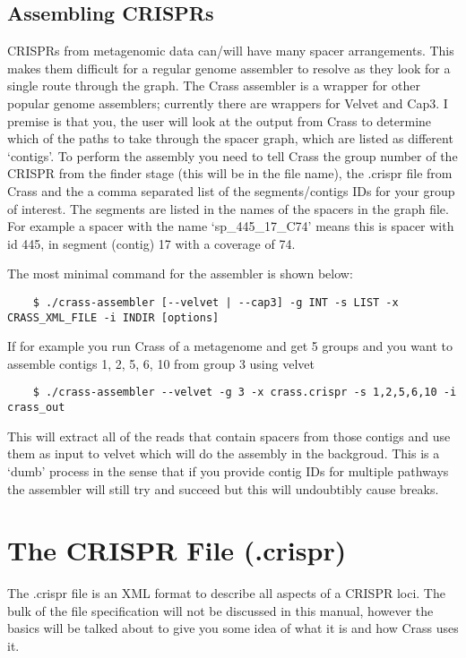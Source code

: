 \documentclass[11pt]{article} %
\begin{document}
\subsection{Assembling CRISPRs}
CRISPRs from metagenomic data can/will have many spacer arrangements.  
This makes them difficult for a regular genome assembler to resolve as they look for a single route through the graph.   
The Crass assembler is a wrapper for other popular genome assemblers; currently there are wrappers for Velvet and Cap3.  
I premise is that you, the user will look at the output from Crass to determine which of the paths to take through the spacer graph, which are listed as different `contigs'. 
To perform the assembly you need to tell Crass the group number of the CRISPR from the finder stage (this will be in the file name), the .crispr file from Crass and the a comma separated list of the segments/contigs IDs for your group of interest.  
The segments are listed in the names of the spacers in the graph file.  
For example a spacer with the name `sp\_445\_17\_C74' means this is spacer with id 445, in segment (contig) 17 with a coverage of 74.

  The most minimal command for the assembler is shown below: 
 \begin{lstlisting}
    $ ./crass-assembler [--velvet | --cap3] -g INT -s LIST -x CRASS_XML_FILE -i INDIR [options]
\end{lstlisting}
 If for example you run Crass of a metagenome and get 5 groups and you want to assemble contigs 1, 2, 5, 6, 10 from group 3 using velvet
 \begin{lstlisting}
	$ ./crass-assembler --velvet -g 3 -x crass.crispr -s 1,2,5,6,10 -i crass_out
\end{lstlisting}

This will extract all of the reads that contain spacers from those contigs and use them as input to velvet which will do the assembly in the backgroud.  This is a `dumb' process in the sense that if you provide contig IDs for multiple pathways the assembler will still try and succeed but this will undoubtibly cause breaks. 

\section{The CRISPR File (.crispr)}
\label{sec:Fileformats}
The .crispr file is an XML format to describe all aspects of a CRISPR loci.  The bulk of the file specification will not be discussed in this manual, however the basics will be talked about to give you some idea of what it is and how Crass uses it.
\end{document}
